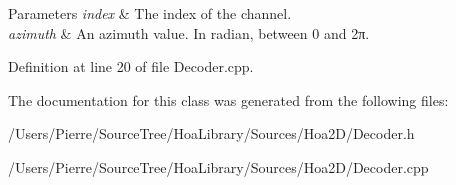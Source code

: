 \begin{DoxyParams}{Parameters}
{\em index} & The index of the channel. \\
\hline
{\em azimuth} & An azimuth value. In radian, between 0 and 2π. \\
\hline
\end{DoxyParams}


Definition at line 20 of file Decoder.\-cpp.



The documentation for this class was generated from the following files\-:\begin{DoxyCompactItemize}
\item 
/\-Users/\-Pierre/\-Source\-Tree/\-Hoa\-Library/\-Sources/\-Hoa2\-D/Decoder.\-h\item 
/\-Users/\-Pierre/\-Source\-Tree/\-Hoa\-Library/\-Sources/\-Hoa2\-D/Decoder.\-cpp\end{DoxyCompactItemize}

